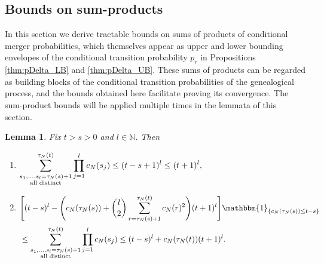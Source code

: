 \documentclass[12pt,authoryear]{article}
\newtheorem{lemma}{Lemma}
\theoremstyle{definition}
\newcommand{\1}[1]{\mathbbm{1}_{#1}}
\begin{document}
\subsection{Bounds on sum-products}\label{sec:bounds_on_sum-products}

In this section we derive tractable bounds on sums of products of conditional merger probabilities, which themselves appear as upper and lower bounding envelopes of the conditional transition probability $p_r$ in Propositions \ref{thm:pDelta_LB} and \ref{thm:pDelta_UB}.
These sums of products can be regarded as building blocks of the conditional transition probabilities of the genealogical process, and the bounds obtained here facilitate proving its convergence. 
The sum-product bounds will be applied multiple times in the lemmata of this section.

\begin{lemma}\label{thm:sumprod1}
Fix $t > s > 0$ and $l\in\mathbb{N}$.
Then
\begin{enumerate}[label=$(\alph*)$]
\item \label{thm:sumprod1_a} %
$\begin{aligned}[t]
\sum_{\substack{ s_1, \dots, s_l =\tau_N(s)+1 \\ \text{\normalfont{all distinct}} }}^{\tau_N(t)}
        \prod_{j=1}^l c_N(s_j)
    \leq (t - s + 1)^l \leq (t+1)^l,
\end{aligned}$
\item \label{thm:sumprod1_b} %
$\begin{aligned}[t]
&\Bigg[ (t - s)^l - \Bigg( c_N(\tau_N(s)) + \binom{l}{2} \sum_{r = \tau_N(s) + 1}^{\tau_N(t)} c_N(r)^2 \Bigg) (t + 1)^l \Bigg]  \1{\{ c_N(\tau_N(s)) \leq t - s\}} \\
&\leq \sum_{\substack{ s_1, \dots, s_l =\tau_N(s) + 1 \\ \text{\normalfont{all distinct}} }}^{\tau_N(t)} \prod_{j=1}^l c_N(s_j) \leq (t - s)^l + c_N(\tau_N(t)) (t+1)^l.
\end{aligned}$
\end{enumerate}
\end{lemma}
\end{document}
